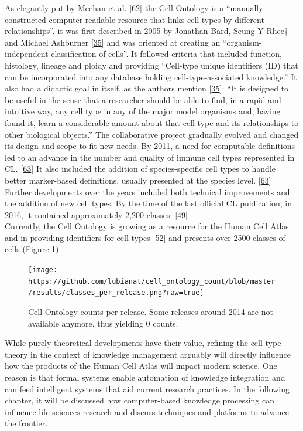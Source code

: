 As elegantly put by Meehan et al. {[}\protect\hyperlink{ref-UduMr7x2}{62}{]} the Cell Ontology is a ``manually constructed computer-readable resource that links cell types by different relationships''.
it was first described in 2005 by Jonathan Bard, Seung Y Rhee† and Michael Ashburner {[}\protect\hyperlink{ref-1CI8uS6ka}{35}{]} and was oriented at creating an ``organism-independent classification of cells''.
It followed criteria that included function, histology, lineage and ploidy and providing ``Cell-type unique identifiers (ID) that can be incorporated into any database holding cell-type-associated knowledge.''
It also had a didactic goal in itself, as the authors mention {[}\protect\hyperlink{ref-1CI8uS6ka}{35}{]}:
``It is designed to be useful in the sense that a researcher should be able to find, in a rapid and intuitive way, any cell type in any of the major model organisms and, having found it, learn a considerable amount about that cell type and its relationships to other biological objects.''
The collaborative project gradually evolved and changed its design and scope to fit new needs.
By 2011, a need for computable definitions led to an advance in the number and quality of immune cell types represented in CL. {[}\protect\hyperlink{ref-ecteO8vI}{63}{]}
It also included the addition of species-specific cell types to handle better marker-based definitions, usually presented at the species level. {[}\protect\hyperlink{ref-ecteO8vI}{63}{]}
Further developments over the years included both technical improvements and the addition of new cell types.
By the time of the last official CL publication, in 2016, it contained approximately 2,200 classes. {[}\protect\hyperlink{ref-agnqfdk6}{49}{]}\\
Currently, the Cell Ontology is growing as a resource for the Human Cell Atlas and in providing identifiers for cell types {[}\protect\hyperlink{ref-qT8WxqjA}{52}{]} and presents over 2500 classes of cells (Figure \ref{fig:cl_counts})

\begin{figure}
\hypertarget{fig:cl_counts}{%
\centering
\texttt{[image: https://github.com/lubianat/cell\_ontology\_count/blob/master/results/classes\_per\_release.png?raw=true]}
\caption{Cell Ontology counts per release. Some releases around 2014 are not available anymore, thus yielding 0 counts.}\label{fig:cl_counts}
}
\end{figure}

While purely theoretical developments have their value, refining the cell type theory in the context of knowledge management arguably will directly influence how the products of the Human Cell Atlas will impact modern science.
One reason is that formal systems enable automation of knowledge integration and can feed intelligent systems that aid current research practices.
In the following chapter, it will be discussed how computer-based knowledge processing can influence life-sciences research and discuss techniques and platforms to advance the frontier.

